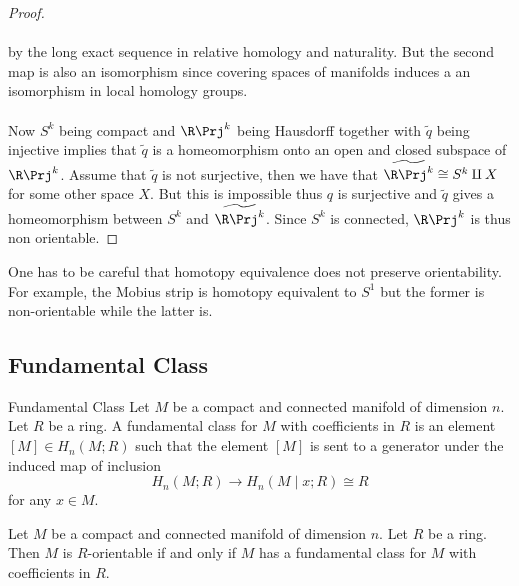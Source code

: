 \documentclass[a4paper]{article}
\begin{document}
\begin{prp}{}{}
\begin{proof}
\\~\\
by the long exact sequence in relative homology and naturality. But the second map is also an isomorphism since covering spaces of manifolds induces a an isomorphism in local homology groups. \\~\\

Now $S^k$ being compact and $\R\Prj^k$ being Hausdorff together with $\widetilde{q}$ being injective implies that $\widetilde{q}$ is a homeomorphism onto an open and closed subspace of $\R\Prj^k$. Assume that $\widetilde{q}$ is not surjective, then we have that $\widetilde{\R\Prj^k}\cong S^k\amalg X$ for some other space $X$. But this is impossible thus $q$ is surjective and $\widetilde{q}$ gives a homeomorphism between $S^k$ and $\widetilde{\R\Prj^k}$. Since $S^k$ is connected, $\R\Prj^k$ is thus non orientable. 
\end{proof}
\end{prp}

One has to be careful that homotopy equivalence does not preserve orientability. For example, the Mobius strip is homotopy equivalent to $S^1$ but the former is non-orientable while the latter is. 

\subsection{Fundamental Class}
\begin{defn}{Fundamental Class}{} Let $M$ be a compact and connected manifold of dimension $n$. Let $R$ be a ring. A fundamental class for $M$ with coefficients in $R$ is an element $[M]\in H_n(M;R)$ such that the element $[M]$ is sent to a generator under the induced map of inclusion $$H_n(M;R)\to H_n(M\;|\;x;R)\cong R$$ for any $x\in M$. 
\end{defn}

\begin{lmm}{}{} Let $M$ be a compact and connected manifold of dimension $n$. Let $R$ be a ring. Then $M$ is $R$-orientable if and only if $M$ has a fundamental class for $M$ with coefficients in $R$. 
\end{lmm}
\end{document}
